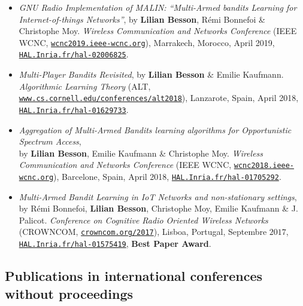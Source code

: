 \begin{itemize}
\item
    \emph{GNU Radio Implementation of MALIN: ``Multi-Armed bandits Learning for Internet-of-things Networks''},
    by \textbf{Lilian Besson}, Rémi Bonnefoi \& Christophe Moy.
    \emph{Wireless Communication and Networks Conference} (IEEE WCNC, \href{http://wcnc2019.ieee-wcnc.org}{\texttt{wcnc2019.ieee-wcnc.org}}), Marrakech, Morocco, April 2019,
    \href{https://HAL.Inria.fr/hal-02006825}{\texttt{HAL.Inria.fr/hal-02006825}}.
    \cite{Besson2019WCNC}

\item
    \emph{Multi-Player Bandits Revisited},
    by \textbf{Lilian Besson} \& Emilie Kaufmann.
    \emph{Algorithmic Learning Theory} (ALT, \href{http://www.cs.cornell.edu/conferences/alt2018}{\texttt{www.cs.cornell.edu/conferences/alt2018}}), Lanzarote, Spain, April 2018,
    \href{https://HAL.Inria.fr/hal-01629733}{\texttt{HAL.Inria.fr/hal-01629733}}.
    \cite{Besson2018ALT}

\item
    \emph{Aggregation of Multi-Armed Bandits learning algorithms for Opportunistic Spectrum Access},\\
    by \textbf{Lilian Besson}, Emilie Kaufmann \& Christophe Moy.
    \emph{Wireless Communication and Networks Conference} (IEEE WCNC, \href{http://wcnc2018.ieee-wcnc.org}{\texttt{wcnc2018.ieee-wcnc.org}}), Barcelone, Spain, April 2018,
    \href{https://HAL.Inria.fr/hal-01705292}{\texttt{HAL.Inria.fr/hal-01705292}}.
    \cite{Besson2018WCNC}

\item
    \emph{Multi-Armed Bandit Learning in IoT Networks and non-stationary settings},
    by Rémi Bonnefoi, \textbf{Lilian Besson}, Christophe Moy, Emilie Kaufmann \& J. Palicot.
    \emph{Conference on Cognitive Radio Oriented Wireless Networks} (CROWNCOM, \href{http://crowncom.org/2017}{\texttt{crowncom.org/2017}}), Lisboa, Portugal, Septembre $2017$,
    \href{https://HAL.Inria.fr/hal-01575419}{\texttt{HAL.Inria.fr/hal-01575419}},
    \textbf{Best Paper Award}.
    \cite{Bonnefoi17}

\end{itemize}

\subsection{Publications in international conferences without proceedings}

